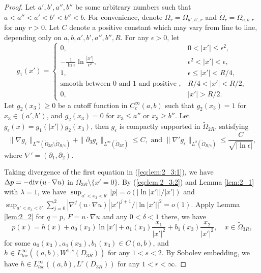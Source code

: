 \documentclass[12pt]{article}
\newcommand{\dive}{{\rm div \hspace{0.05cm} }}
\begin{document}
\begin{proof}
	Let $a', b', a'', b''$ be some arbitrary numbers such that $a<a''<a'<b'<b''<b$. For convenience, denote $\Omega_r=\Omega_{a', b', r}$ and $\tilde{\Omega}_r=\Omega_{a, b, r}$ for any $r>0$. Let $C$ denote a positive constant which may vary from line to line, depending only on $a, b, a', b', a'', b'', R$. For any $\epsilon>0$, let
	\[
		g_1(x') =
		\left\{
		\begin{array}{ll}
			0, & 0<|x'| \le \epsilon^2,\\
			\displaystyle -\frac{1}{\ln \epsilon}\ln \frac{|x'|}{\epsilon^2}, & \epsilon^2<|x'|<\epsilon,\\
			1, & \epsilon\le |x'|<R/4,\\
			\textrm{smooth between $0$ and $1$ and positive }, & R/4<|x'|<R/2,\\ 
			0,& |x'|>R/2. 
		\end{array}
		\right.
	\]
	Let $g_2(x_3)\ge 0$ be a cutoff function in $C^{\infty}_c(a, b)$ such that $g_2(x_3)=1$ for $x_3\in (a', b')$, and $g_2(x_3)=0$ for $x_3\le a''$ or $x_3\ge b''$. Let $g_{\epsilon}(x)=g_1(|x'|)g_2(x_3)$, then $g_{\epsilon}$ is compactly supported in $\tilde{\Omega}_{2R}$, satisfying 
	\begin{equation}\label{eq:lem:2_3:pf:1}
		\| \nabla g_{\epsilon} \|_{ L^{\infty} (\tilde{\Omega}_{2R} \setminus \tilde{\Omega}_{R/4} ) } + \| \partial_3 g_{\epsilon} \|_{ L^{\infty} (\tilde{\Omega}_{2R}) } \le C, \textrm{ and } \| \nabla' g_{\epsilon} \|_{ L^2 ( \tilde{\Omega}_{R/4} ) }
				\le \frac{C}{\sqrt{| \ln\epsilon|}},
	\end{equation}
	where $\nabla'=(\partial_1, \partial_2)$. 
	
	Taking divergence of the first equation in (\ref{eq:lem:2_3:1}), we have $\Delta p=-\dive (u\cdot \nabla u)$ in $\Omega_{3R}\setminus\{x'=0\}$. By (\ref{eq:lem:2_3:2}) and Lemma \ref{lem:2_1} with $\lambda=1$, we have $\sup_{a'<x_3<b'}|p|=o(| \ln |x'| |/|x'|)$ and $\sup_{a'<x_3<b'}\sum_{j=0}^{2}|\nabla^j (u\cdot \nabla u)| |x'|^{j+1}/| \ln|x'| |^2=o(1)$. Apply Lemma \ref{lem:2_2} for $q=p$, $F=u\cdot \nabla u$ and any $0<\delta<1$ there, we have 
	\begin{equation}\label{eq:lem:2_3:pf:2}
		p(x)=h(x)+a_0(x_3)\ln |x'|+a_1(x_3)\frac{x_1}{|x'|^2}+b_1(x_3)\frac{x_2}{|x'|^2}, \quad x\in \tilde{\Omega}_{3R}, 
	\end{equation}
	for some $a_0(x_3), a_1(x_3), b_1(x_3)\in C(a, b)$, and $h\in L^{\infty}_{loc}((a, b), W^{1, s}(D_{3R}))$ for any $1<s<2$. By Sobolev embedding, we have $h\in L^{\infty}_{loc}((a, b), L^{r}(D_{3R}))$ for any $1<r<\infty$. 
	

\end{proof}
\end{document}
